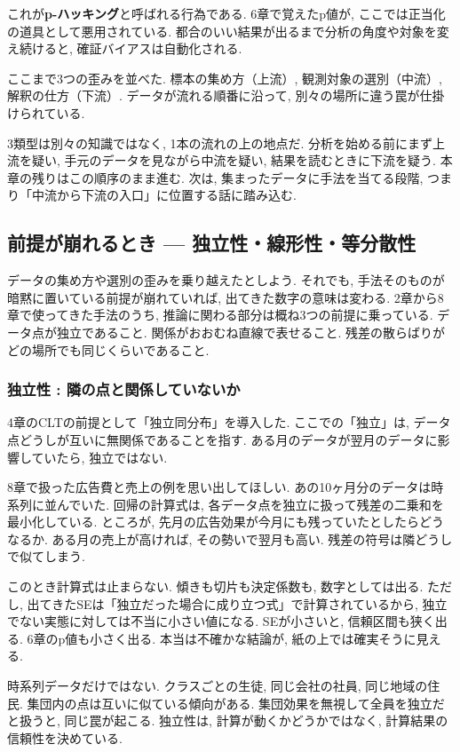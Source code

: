 これが\textbf{p-ハッキング}と呼ばれる行為である.
6章で覚えたp値が, ここでは正当化の道具として悪用されている.
都合のいい結果が出るまで分析の角度や対象を変え続けると, 確証バイアスは自動化される.

ここまで3つの歪みを並べた.
標本の集め方（上流）, 観測対象の選別（中流）, 解釈の仕方（下流）.
データが流れる順番に沿って, 別々の場所に違う罠が仕掛けられている.

3類型は別々の知識ではなく, 1本の流れの上の地点だ.
分析を始める前にまず上流を疑い, 手元のデータを見ながら中流を疑い, 結果を読むときに下流を疑う.
本章の残りはこの順序のまま進む.
次は, 集まったデータに手法を当てる段階, つまり「中流から下流の入口」に位置する話に踏み込む.


\subsection{前提が崩れるとき — 独立性・線形性・等分散性}

データの集め方や選別の歪みを乗り越えたとしよう.
それでも, 手法そのものが暗黙に置いている前提が崩れていれば, 出てきた数字の意味は変わる.
2章から8章で使ってきた手法のうち, 推論に関わる部分は概ね3つの前提に乗っている.
データ点が独立であること. 関係がおおむね直線で表せること. 残差の散らばりがどの場所でも同じくらいであること.

\subsubsection*{独立性 : 隣の点と関係していないか}

4章のCLTの前提として「独立同分布」を導入した.
ここでの「独立」は, データ点どうしが互いに無関係であることを指す.
ある月のデータが翌月のデータに影響していたら, 独立ではない.

8章で扱った広告費と売上の例を思い出してほしい.
あの10ヶ月分のデータは時系列に並んでいた.
回帰の計算式は, 各データ点を独立に扱って残差の二乗和を最小化している.
ところが, 先月の広告効果が今月にも残っていたとしたらどうなるか.
ある月の売上が高ければ, その勢いで翌月も高い. 残差の符号は隣どうしで似てしまう.

このとき計算式は止まらない. 傾きも切片も決定係数も, 数字としては出る.
ただし, 出てきたSEは「独立だった場合に成り立つ式」で計算されているから, 独立でない実態に対しては不当に小さい値になる.
SEが小さいと, 信頼区間も狭く出る. 6章のp値も小さく出る.
本当は不確かな結論が, 紙の上では確実そうに見える.

時系列データだけではない. クラスごとの生徒, 同じ会社の社員, 同じ地域の住民. 集団内の点は互いに似ている傾向がある.
集団効果を無視して全員を独立だと扱うと, 同じ罠が起こる.
独立性は, 計算が動くかどうかではなく, 計算結果の信頼性を決めている.

